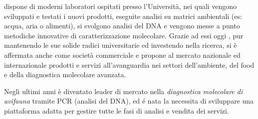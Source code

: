 {\fem} dispone di moderni laboratori ospitati presso l’Università, nei quali vengono sviluppati e testati i nuovi prodotti, eseguite analisi su matrici ambientali (es: acqua, aria o alimenti), si svolgono analisi del DNA e vengono messe a punto metodiche innovative di caratterizzazione molecolare. Grazie ad essi oggi {\fem}, pur mantenendo le sue solide radici universitarie ed investendo nella ricerca, si è affermata anche come società commerciale e propone al mercato nazionale ed internazionale prodotti e servizi all'avanguardia nei settori dell'ambiente, del food e della diagnostica molecolare avanzata.

Negli ultimi anni è diventato leader di mercato nella \emph{diagnostica molecolare di avifauna} tramite PCR (analisi del DNA), ed é nata la necessita di sviluppare una piattaforma adatta per gestire tutte le fasi di analisi e vendita dei servizi.


